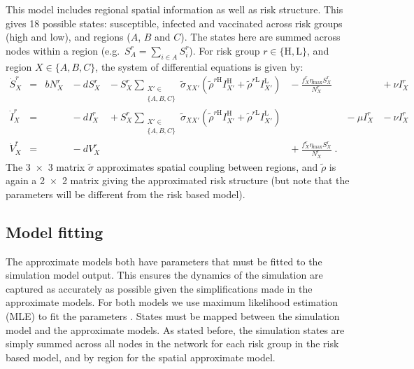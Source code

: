 This model includes regional spatial information as well as risk structure. This gives 18 possible states: susceptible, infected and vaccinated across risk groups (high and low), and regions ($A$, $B$ and $C$). The states here are summed across nodes within a region (e.g.\ $S^r_A = \sum_{i\in{}A}S^r_i$). For risk group $r\in{}\{\mathrm{H,L}\}$, and region $X\in{}\{A,B,C\}$, the system of differential equations is given by:
\begin{subequations}
    \begin{alignat}{7}
        \dot{S}^r_X &={} &bN^r_X &{}-{} dS^r_X &{}-{} S^r_X\sum_{\substack{X'\in\\\{A,B,C\}}}\tilde{\sigma}_{XX'}\left(\tilde{\rho}^{r\mathrm{H}}I^{\mathrm{H}}_{X'} + \tilde{\rho}^{r\mathrm{L}}I^{\mathrm{L}}_{X'}\right) &{}-{} \frac{f^r_X\eta{}_\mathrm{max}S^r_X}{N^r_X} &&{}+{} \nu{}I^r_X \\
        \dot{I}^r_X &={}  &&{}-{} dI^r_X &{}+{} S^r_X\sum_{\substack{X'\in\\\{A,B,C\}}}\tilde{\sigma}_{XX'}\left(\tilde{\rho}^{r\mathrm{H}}I^{\mathrm{H}}_{X'} + \tilde{\rho}^{r\mathrm{L}}I^{\mathrm{L}}_{X'}\right)& &{}-{} \mu{}I^r_X &{}-{} \nu{}I^r_X \\
        \dot{V}^r_X &={}  &&{}-{} dV^r_X &&{}+{} \frac{f^r_X\eta{}_\mathrm{max}S^r_X}{N^r_X}\;.
    \end{alignat}
    \label{eq:space_model}
\end{subequations}
The \num{3x3} matrix $\tilde{\sigma}$ approximates spatial coupling between regions, and $\tilde{\rho}$ is again a \num{2x2} matrix giving the approximated risk structure (but note that the parameters will be different from the risk based model).

\subsection{Model fitting\label{sec:ch4:model_fitting}}

The approximate models both have parameters that must be fitted to the simulation model output. This ensures the dynamics of the simulation are captured as accurately as possible given the simplifications made in the approximate models. For both models we use maximum likelihood estimation (MLE) to fit the parameters \citep{aldrich_ra_1997}. States must be mapped between the simulation model and the approximate models. As stated before, the simulation states are simply summed across all nodes in the network for each risk group in the risk based model, and by region for the spatial approximate model.


